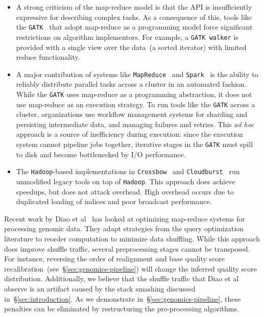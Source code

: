 \documentclass{sig-alternate}
\begin{document}
\begin{itemize}
\item A strong criticism of the map-reduce model is that the API is insufficiently expressive
for describing complex tasks. As a consequence of this, tools like the \texttt{GATK}~\cite{mckenna10} that
adopt map-reduce as a programming model force significant restrictions on algorithm implementors. For
example, a \texttt{GATK walker} is provided with a single view over the data~(a sorted iterator) with limited reduce
functionality.
\item A major contribution of systems like \texttt{MapReduce}~\cite{dean08} and \texttt{Spark}~\cite{zaharia10,
zaharia12} is the ability to reliably distribute parallel tasks across a cluster in an automated fashion. While
the \texttt{GATK} uses map-reduce as a programming abstraction, it does not use map-reduce as an execution strategy.
To run tools like the \texttt{GATK} across a cluster, organizations use workflow management systems for sharding and
persisting intermediate data, and managing failures and retries. This \emph{ad hoc} approach is a source of inefficiency
during execution: since the execution system cannot pipeline jobs together, iterative stages in the \texttt{GATK} must
spill to disk and become bottlenecked by I/O performance.
\item The \texttt{Hadoop}-based implementations in \texttt{Crossbow}~\cite{langmead09} and
\texttt{Cloudburst}~\cite{schatz09} run unmodified legacy tools on top of \texttt{Hadoop}. This approach does
achieve speedups, but does not attack overhead. High overhead occurs due to duplicated loading of indices and poor
broadcast performance.
\end{itemize}

Recent work by Diao et al~\cite{diao15} has looked at optimizing map-reduce systems for
processing genomic data. They adapt strategies from the query optimization literature to reorder
computation to minimize data shuffling. While this approach does improve shuffle traffic, several
preprocessing stages cannot be transposed. For instance, reversing the order of realignment and
base quality score recalibration~(see~\S\ref{sec:genomics-pipeline}) will change the inferred quality
score distribution. Additionally, we believe that the shuffle traffic that Diao et al observe is an artifact
caused by the stack smashing discussed in~\S\ref{sec:introduction}. As we demonstrate
in~\S\ref{sec:genomics-pipeline}, these penalties can be eliminated by restructuring the pre-processing
algorithms.
\end{document}
